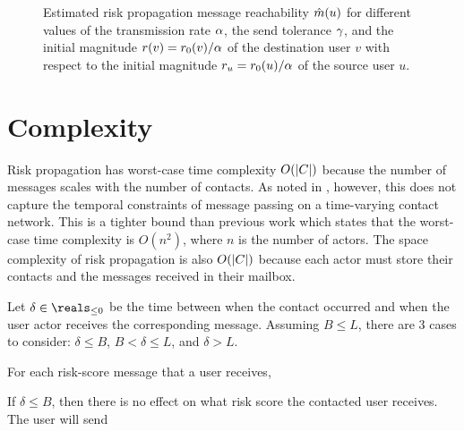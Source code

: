 \begin{figure}[htbp]
\caption[Estimated risk propagation message reachability]{Estimated risk propagation message reachability $\hat{m}(u)$ for different values of the transmission rate $\alpha$, the send tolerance $\gamma$, and the initial magnitude $r(v) = r_0(v) / \alpha$ of the destination user $v$ with respect to the initial magnitude $r_u = r_0(u) / \alpha$ of the source user $u$.}
\label{fig:reach}
\end{figure}

\section{Complexity}

Risk propagation has worst-case time complexity $O(\left\vert C \right\vert)$ because the number of messages scales with the number of contacts. As noted in , however, this does not capture the temporal constraints of message passing on a time-varying contact network. This is a tighter bound than previous work \cite{Ayday2021} which states that the worst-case time complexity is $O(n^2)$, where $n$ is the number of actors. The space complexity of risk propagation is also $O(\left\vert C \right\vert)$ because each actor must store their contacts and the messages received in their mailbox.

Let $\delta \in \reals_{\leq 0}$ be the time between when the contact occurred and when the user actor receives the corresponding message. Assuming $B \leq L$, there are 3 cases to consider: $\delta \leq B$, $B < \delta \leq L$, and $\delta > L$.

For each risk-score message that a user receives,

If $\delta \leq B$, then there is no effect on what risk score the contacted user receives. The user will send